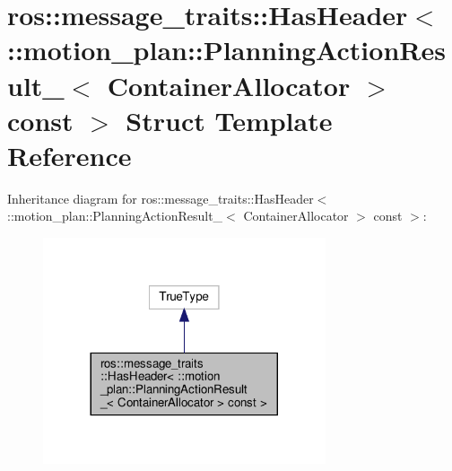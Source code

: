 \hypertarget{structros_1_1message__traits_1_1HasHeader_3_01_1_1motion__plan_1_1PlanningActionResult___3_01Con4b542e15d932c6e8a08fcc15d96975b0}{}\section{ros\+:\+:message\+\_\+traits\+:\+:Has\+Header$<$ \+:\+:motion\+\_\+plan\+:\+:Planning\+Action\+Result\+\_\+$<$ Container\+Allocator $>$ const $>$ Struct Template Reference}
\label{structros_1_1message__traits_1_1HasHeader_3_01_1_1motion__plan_1_1PlanningActionResult___3_01Con4b542e15d932c6e8a08fcc15d96975b0}


Inheritance diagram for ros\+:\+:message\+\_\+traits\+:\+:Has\+Header$<$ \+:\+:motion\+\_\+plan\+:\+:Planning\+Action\+Result\+\_\+$<$ Container\+Allocator $>$ const $>$\+:
\nopagebreak
\begin{figure}[H]
\begin{center}
\leavevmode
\includegraphics[width=236pt]{structros_1_1message__traits_1_1HasHeader_3_01_1_1motion__plan_1_1PlanningActionResult___3_01Con7c2404c91380917b58bf23efd9bf9f15}
\end{center}
\end{figure}


